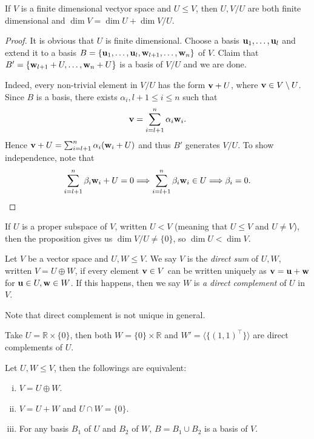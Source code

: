 \documentclass[a4paper,11pt]{article}
\begin{document}
\begin{proposition}
    If $V$ is a finite dimensional vectyor space and $U\le V$, then $U,V/U$ are both finite dimensional and $\dim V=\dim U+\dim V/U$.
\end{proposition}
\begin{proof}
    It is obvious that $U$ is finite dimensional.
    Choose a basis ${\bf u}_1,\ldots,{\bf u}_l$ and extend it to a basis $B=\{{\bf u}_1,\ldots,{\bf u}_l,{\bf w}_{l+1},\ldots,{\bf w}_n\}$ of $V$. Claim that $B'=\{{\bf w}_{l+1}+U,\ldots,{\bf w}_n+U\}$ is a basis of $V/U$ and we are done.

    Indeed, every non-trivial element in $ V/U $ has the form $ {\bf v}+U $, where $ {\bf v}\in V \setminus U $. Since $B$ is a basis, there exists $ \alpha_i,l+1\le i\le n $ such that 
    \[
        {\bf v} = \sum_{i=l+1}^{n}\alpha_i{\bf w}_i.
    \]
    Hence $ {\bf v}+U = \sum_{i=l+1}^{n}\alpha_i({\bf w}_i +U)$ and thus $ B' $ generates $V/U$. To show independence, note that 
    \[
        \sum_{i=l+1}^{n}\beta_i {\bf w}_i+U=0 \Longrightarrow \sum_{i=l+1}^{n}\beta_i {\bf w}_i\in U \Longrightarrow \beta_i=0.\qedhere
    \]
\end{proof}
\begin{remark}
    If $U$ is a proper subspace of $V$, written $U<V$ (meaning that $U\le V$ and $U\neq V$), then the proposition gives us $\dim V/U\neq \{0\}$, so $\dim U<\dim V$.
\end{remark}
\begin{definition}
    Let $V$ be a vector space and $U,W\le V$.
    We say $V$ is the \textit{direct sum} of $U,W$, written $V=U\oplus W$, if every element ${\bf v}\in V$ can be written uniquely as ${\bf v}={\bf u}+{\bf w}$ for ${\bf u}\in U,{\bf w}\in W$.
    If this happens, then we say $W$ is \textit{a direct complement} of $U$ in $V$.
\end{definition}
Note that direct complement is not unique in general.
\begin{example}
    Take $U=\mathbb R\times \{0\}$, then both $W=\{0\}\times \mathbb R$ and $W'=\langle\{(1,1)^\top\}\rangle$ are direct complements of $U$.
\end{example}
\begin{lemma}\label{equivalence_of_direct_sum}
    Let $U,W\le V$, then the followings are equivalent:
    \begin{enumerate}[(i)]
        \item $V=U\oplus W$.
        \item $V=U+W$ and $U\cap W=\{0\}$.
        \item For any basis $B_1$ of $U$ and $B_2$ of $W$, $B=B_1\cup B_2$ is a basis of $V$.
    \end{enumerate}
\end{lemma}
\end{document}
